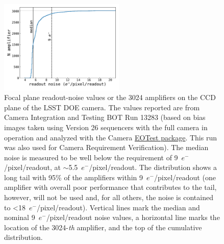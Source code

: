 \documentclass[PST,authoryear,toc]{lsstdoc}
\begin{document}
\FloatBarrier
\begin{figure}[!ht]
\centering
\includegraphics[width=0.53\textwidth]{figures/ampnoise.pdf}
\caption{Focal plane readout-noise values or the 3024 amplifiers on the CCD plane of the LSST DOE camera. The values reported are from Camera Integration and Testing BOT Run 13283 (based on bias images taken using Version 26 sequencers with the full camera in operation and analyzed with the Camera \href{https://github.com/lsst-camera-dh/eotest}{EOTest package}.  This run was also used for Camera Requirement Verification). The median noise is measured to be well below the requirement of 9~$e^-$/pixel/readout, at $\sim$5.5~$e^-$/pixel/readout. The distribution shows a long tail with 95\% of the amplifiers within 9~$e^-$/pixel/readout (one amplifier with overall poor performance that contributes to the tail, however, will not be used and, for all others, the noise is contained to <18~$e^-$/pixel/readout). Vertical lines mark the median and nominal 9~$e^-$/pixel/readout noise values, a horizontal line marks the location of the 3024-{\it th} amplifier, and the top of the cumulative distribution.}\label{fig:rndist}
\end{figure}


\FloatBarrier
 \FloatBarrier
\end{document}
